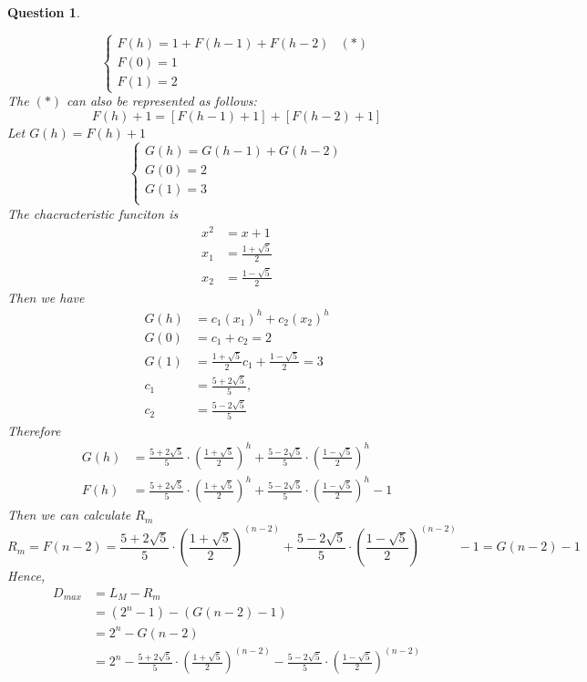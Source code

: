 \documentclass[10.5pt]{article}
\newtheorem{Q}{Question}
\begin{document}
\begin{Q}
\begin{enumerate}[(1)]
		$$
		\begin{cases}
			F(h) = 1 + F(h - 1) + F(h - 2) & (*)\\
			F(0) = 1 \\
			F(1) = 2 
		\end{cases}
		$$
		\textup{The $(*)$ can also be represented as follows:}
		$$
		F(h) + 1 = \left[F(h - 1) + 1\right] + \left[F(h - 2) + 1\right]
		$$
		\textup{Let $G(h) = F(h) + 1$}\\
		$$
		\begin{cases}
			G(h) = G(h - 1) + G(h - 2)\\
			G(0) = 2\\
			G(1) = 3\\
		\end{cases}
		$$
		\textup{The chacracteristic funciton is}
		\begin{align*}
			x^2& = x + 1\\
			x_1 &= \frac{1 + \sqrt{5}}{2}\\ 
			x_2 &= \frac{1 - \sqrt{5}}{2}
		\end{align*}
		\textup{Then we have}
		\begin{align*}
			G(h) &= c_1(x_1)^h + c_2(x_2)^h\\
			G(0) &= c_1 + c_2 = 2\\
			G(1) &= \frac{1+\sqrt 5}{2}c_1 + \frac{1-\sqrt 5}{2} = 3\\
			c_1&=\frac{5+2\sqrt{5}}{5},\\ c_2 &=\frac{5-2\sqrt 5}{5}
		\end{align*}
		\textup{Therefore}
		\begin{align*}
			G(h) &= \frac{5+2\sqrt{5}}{5}\cdot\left(\frac{1 + \sqrt{5}}{2}\right)^h + \frac{5-2\sqrt 5}{5}\cdot\left(\frac{1 - \sqrt{5}}{2}\right)^h\\
			F(h) &= \frac{5+2\sqrt{5}}{5}\cdot\left(\frac{1 + \sqrt{5}}{2}\right)^h + \frac{5-2\sqrt 5}{5}\cdot\left(\frac{1 - \sqrt{5}}{2}\right)^h - 1
		\end{align*}
		\textup{Then we can calculate $R_m$}
		$$
		R_m = F(n - 2) = \frac{5+2\sqrt{5}}{5}\cdot\left(\frac{1 + \sqrt{5}}{2}\right)^{(n - 2)} + \frac{5-2\sqrt 5}{5}\cdot\left(\frac{1 - \sqrt{5}}{2}\right)^{(n - 2)} - 1 = G(n - 2) - 1
		$$
		\textup{Hence,}
		\begin{align*}
			D_{max} & = L_M - R_m\\
				&= (2^n - 1) - (G(n - 2) - 1)\\
				&= 2^n - G(n - 2)\\
				&= 2^n - \frac{5+2\sqrt{5}}{5}\cdot\left(\frac{1 + \sqrt{5}}{2}\right)^{(n - 2)} - \frac{5-2\sqrt 5}{5}\cdot\left(\frac{1 - \sqrt{5}}{2}\right)^{(n - 2)}
		\end{align*}
	\end{enumerate}
\end{Q}
\end{document}
